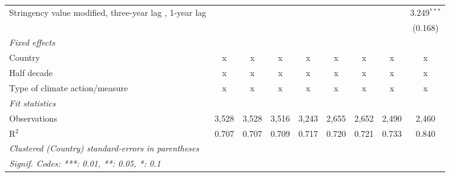 \begin{table}[htbp]
\begin{tabular}{lcccccccc}
      Stringency value modified, three-year lag , 1-year lag                                  &              &              &               &               &               &               &              & 3.249$^{***}$\\   
                                                                                              &              &              &               &               &               &               &              & (0.168)\\   
      \emph{Fixed effects}\\
      Country                                                                                 & x            & x            & x             & x             & x             & x             & x            & x\\  
      Half decade                                                                             & x            & x            & x             & x             & x             & x             & x            & x\\  
      Type of climate action/measure                                                          & x            & x            & x             & x             & x             & x             & x            & x\\  
      \midrule \emph{Fit statistics}\\
      Observations                                                                            & 3,528        & 3,528        & 3,516         & 3,243         & 2,655         & 2,652         & 2,490        & 2,460\\  
      R$^2$                                                                                   & 0.707        & 0.707        & 0.709         & 0.717         & 0.720         & 0.721         & 0.733        & 0.840\\  
      \midrule
      \multicolumn{9}{l}{\emph{Clustered (Country) standard-errors in parentheses}}\\
      \multicolumn{9}{l}{\emph{Signif. Codes: ***: 0.01, **: 0.05, *: 0.1}}\\
   \end{tabular}
\end{table}


